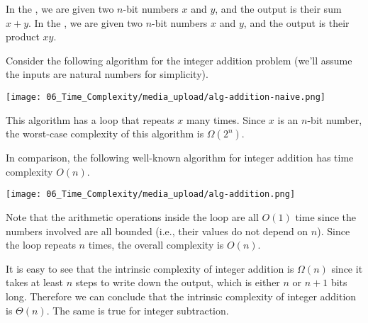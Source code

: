 \begin{definition}
\label{definition:Integer-addition-and-integer-multiplication-problems} 
In the , we are given two $n$-bit numbers $x$ and $y$, and the output is their sum $x+y$. In the , we are given two $n$-bit numbers $x$ and $y$, and the output is their product $xy$.

\end{definition}

\begin{note}
\label{note:Algorithms-for-integer-addition}
Consider the following algorithm for the integer addition problem (we'll assume the inputs are natural numbers for simplicity).

\begin{center}
\texttt{[image: 06\_Time\_Complexity/media\_upload/alg-addition-naive.png]}
\end{center}

This algorithm has a loop that repeats $x$ many times. Since $x$ is an $n$-bit number, the worst-case complexity of this algorithm is $\Omega(2^n)$.

In comparison, the following well-known algorithm for integer addition has time complexity $O(n)$.

\begin{center}
\texttt{[image: 06\_Time\_Complexity/media\_upload/alg-addition.png]}
\end{center}

Note that the arithmetic operations inside the loop are all $O(1)$ time since the numbers involved are all bounded (i.e., their values do not depend on $n$). Since the loop repeats $n$ times, the overall complexity is $O(n)$.

It is easy to see that the intrinsic complexity of integer addition is $\Omega(n)$ since it takes at least $n$ steps to write down the output, which is either $n$ or $n+1$ bits long. Therefore we can conclude that the intrinsic complexity of integer addition is $\Theta(n)$. The same is true for integer subtraction.

\end{note}


